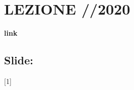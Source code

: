 \section{LEZIONE //2020}
\textbf{link}
\subsection{Slide: }
[1]
\newline[1]
\newline[2]
\newline[3]
\newline[4]
\newline[5]
\newline[6]
\newline[7]
\newline[8]
\newline[9]
\newline[10]
\newline[11]
\newline[12]
\newline[13]
\newline[14]
\newline[15]
\newline[16]
\newline[17]
\newline[18]
\newline[19]
\newline[20]
\newline[21]
\newline[22]
\newline[23]
\newline[24]
\newline[25]
\newline[26]
\newline[27]
\newline[28]
\newline[29]
\newline[30]
\newline[31]
\newline[32]
\newline[33]